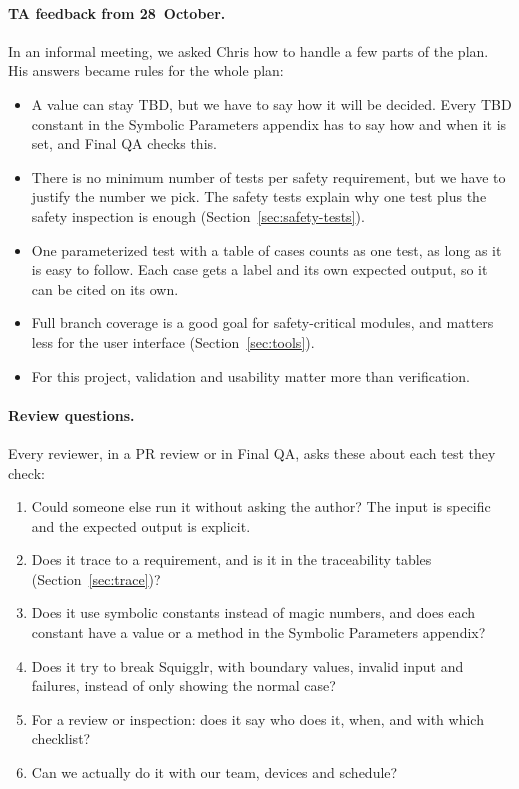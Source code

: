 \documentclass[12pt, titlepage]{article}
\begin{document}
\paragraph{TA feedback from 28~October.} In an informal meeting, we asked
Chris how to handle a few parts of the plan. His answers became rules for the
whole plan:
\begin{itemize}
  \item A value can stay TBD, but we have to say how it will be decided. Every
    TBD constant in the Symbolic Parameters appendix has to say how and when it
    is set, and Final QA checks this.
  \item There is no minimum number of tests per safety requirement, but we
    have to justify the number we pick. The safety tests explain why one test
    plus the safety inspection is enough (Section~\ref{sec:safety-tests}).
  \item One parameterized test with a table of cases counts as one test, as
    long as it is easy to follow. Each case gets a label and its own expected
    output, so it can be cited on its own.
  \item Full branch coverage is a good goal for safety-critical modules, and
    matters less for the user interface (Section~\ref{sec:tools}).
  \item For this project, validation and usability matter more than
    verification.
\end{itemize}

\paragraph{Review questions.} Every reviewer, in a PR review or in Final QA,
asks these about each test they check:
\begin{enumerate}
  \item Could someone else run it without asking the author? The input is
    specific and the expected output is explicit.
  \item Does it trace to a requirement, and is it in the traceability tables
    (Section~\ref{sec:trace})?
  \item Does it use symbolic constants instead of magic numbers, and does each
    constant have a value or a method in the Symbolic Parameters appendix?
  \item Does it try to break Squigglr, with boundary values, invalid input and
    failures, instead of only showing the normal case?
  \item For a review or inspection: does it say who does it, when, and with
    which checklist?
  \item Can we actually do it with our team, devices and schedule?
\end{enumerate}
\end{document}
